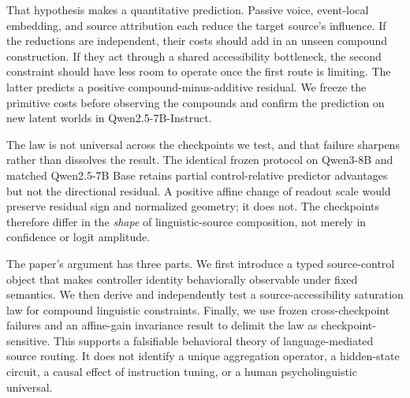 That hypothesis makes a quantitative prediction. Passive voice, event-local
embedding, and source attribution each reduce the target source's influence.
If the reductions are independent, their costs should add in an unseen compound
construction. If they act through a shared accessibility bottleneck, the second
constraint should have less room to operate once the first route is limiting.
The latter predicts a positive compound-minus-additive residual. We freeze the
primitive costs before observing the compounds and confirm the prediction on
new latent worlds in Qwen2.5-7B-Instruct.

The law is not universal across the checkpoints we test, and that failure
sharpens rather than dissolves the result. The identical frozen protocol on
Qwen3-8B and matched Qwen2.5-7B Base retains partial control-relative predictor
advantages but not the directional residual. A positive affine change of
readout scale would preserve residual sign and normalized geometry; it does
not. The checkpoints therefore differ in the \emph{shape} of linguistic-source
composition, not merely in confidence or logit amplitude.

The paper's argument has three parts. We first introduce a typed source-control
object that makes controller identity behaviorally observable under fixed
semantics. We then derive and independently test a source-accessibility
saturation law for compound linguistic constraints. Finally, we use frozen
cross-checkpoint failures and an affine-gain invariance result to delimit the
law as checkpoint-sensitive. This supports a falsifiable behavioral theory of
language-mediated source routing. It does not identify a unique aggregation
operator, a hidden-state circuit, a causal effect of instruction tuning, or a
human psycholinguistic universal.
